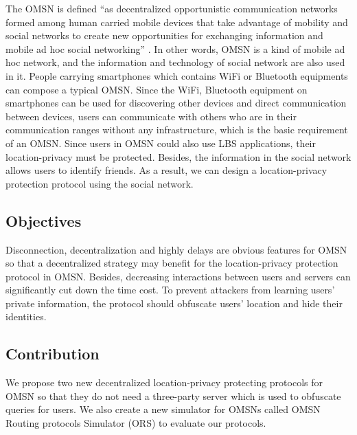 The OMSN is defined ``as decentralized opportunistic communication networks formed among human carried mobile devices that take advantage of mobility and social networks to create new opportunities for exchanging information and mobile ad hoc social networking'' \cite {C2}. In other words, OMSN is a kind of mobile ad hoc network, and the information and technology of social network are also used in it. People carrying smartphones which contains WiFi or Bluetooth equipments can compose a typical OMSN. Since the WiFi, Bluetooth equipment on smartphones can be used for discovering other devices and direct communication between devices, users can communicate with others who are in their communication ranges without any infrastructure, which is the basic requirement of an OMSN. Since users in OMSN could also use LBS applications, their location-privacy must be protected. Besides, the information in the social network allows users to identify friends. As a result, we can design a location-privacy protection protocol using the social network.


\subsection{ Objectives}

\noindent Disconnection, decentralization and highly delays are obvious features for OMSN so that a decentralized strategy may benefit for the location-privacy protection protocol in OMSN. Besides, decreasing interactions between users and servers can significantly cut down the time cost. To prevent attackers from learning users' private information, the protocol should obfuscate users' location and hide their identities.


\subsection{ Contribution}

\noindent We propose two new decentralized location-privacy protecting protocols for OMSN so that they do not need a three-party server which is used to obfuscate queries for users. We also create a new simulator for OMSNs called OMSN Routing protocols Simulator (ORS) to evaluate our protocols.

